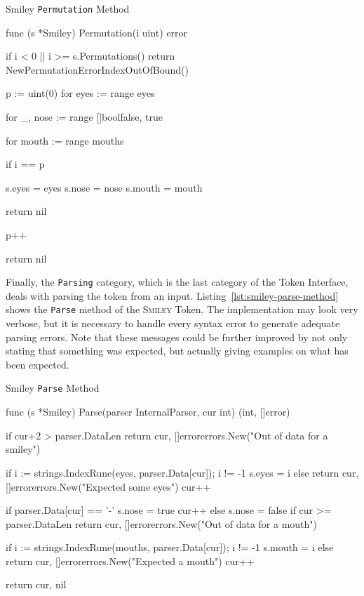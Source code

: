 \begin{listing}
\caption{Smiley \texttt{Permutation} Method}
\label{lst:smiley-permutation-method}
\begin{gocode}
func (s *Smiley) Permutation(i uint) error {
	if i < 0 || i >= s.Permutations() {
		return NewPermutationErrorIndexOutOfBound()
	}

	p := uint(0)
	for eyes := range eyes {
		for _, nose := range []bool{false, true} {
			for mouth := range mouths {
				if i == p {
					s.eyes = eyes
					s.nose = nose
					s.mouth = mouth

					return nil
				}

				p++
			}
		}
	}

	return nil
}
\end{gocode}
\end{listing}

Finally, the \texttt{Parsing} category, which is the last category of the Token Interface, deals with parsing the token from an input. Listing~\ref{lst:smiley-parse-method} shows the \texttt{Parse} method of the \textsc{Smiley} Token. The implementation may look very verbose, but it is necessary to handle every syntax error to generate adequate parsing errors. Note that these messages could be further improved by not only stating that something was expected, but actually giving examples on what has been expected.

\begin{listing}
\caption{Smiley \texttt{Parse} Method}
\label{lst:smiley-parse-method}
\begin{gocode}
func (s *Smiley) Parse(parser InternalParser, cur int) (int, []error) {
	if cur+2 > parser.DataLen {
		return cur, []error{errors.New("Out of data for a smiley")}
	}

	if i := strings.IndexRune(eyes, parser.Data[cur]); i != -1 {
		s.eyes = i
	} else {
		return cur, []error{errors.New("Expected some eyes")}
	}
	cur++

	if parser.Data[cur] == '-' {
		s.nose = true
		cur++
	} else {
		s.nose = false
	}
	if cur >= parser.DataLen {
		return cur, []error{errors.New("Out of data for a mouth")}
	}

	if i := strings.IndexRune(mouths, parser.Data[cur]); i != -1 {
		s.mouth = i
	} else {
		return cur, []error{errors.New("Expected a mouth")}
	}
	cur++

	return cur, nil
}
\end{gocode}
\end{listing}


